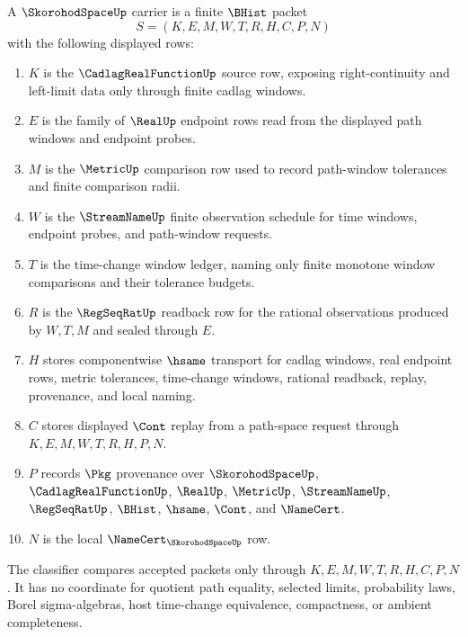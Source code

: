 \begin{definition}
\label{def:skorohod-space-carrier}
A $\SkorohodSpaceUp$ carrier is a finite $\BHist$ packet
$$
S=(K,E,M,W,T,R,H,C,P,N)
$$
with the following displayed rows:
\begin{enumerate}
\item $K$ is the $\CadlagRealFunctionUp$ source row, exposing right-continuity and left-limit data only through finite cadlag windows.
\item $E$ is the family of $\RealUp$ endpoint rows read from the displayed path windows and endpoint probes.
\item $M$ is the $\MetricUp$ comparison row used to record path-window tolerances and finite comparison radii.
\item $W$ is the $\StreamNameUp$ finite observation schedule for time windows, endpoint probes, and path-window requests.
\item $T$ is the time-change window ledger, naming only finite monotone window comparisons and their tolerance budgets.
\item $R$ is the $\RegSeqRatUp$ readback row for the rational observations produced by $W,T,M$ and sealed through $E$.
\item $H$ stores componentwise $\hsame$ transport for cadlag windows, real endpoint rows, metric tolerances, time-change windows, rational readback, replay, provenance, and local naming.
\item $C$ stores displayed $\Cont$ replay from a path-space request through $K,E,M,W,T,R,H,P,N$.
\item $P$ records $\Pkg$ provenance over $\SkorohodSpaceUp$, $\CadlagRealFunctionUp$, $\RealUp$, $\MetricUp$, $\StreamNameUp$, $\RegSeqRatUp$, $\BHist$, $\hsame$, $\Cont$, and $\NameCert$.
\item $N$ is the local $\NameCert_{\SkorohodSpaceUp}$ row.
\end{enumerate}
The classifier compares accepted packets only through $K,E,M,W,T,R,H,C,P,N$. It has no coordinate for quotient path equality, selected limits, probability laws, Borel sigma-algebras, host time-change equivalence, compactness, or ambient completeness.
\end{definition}

